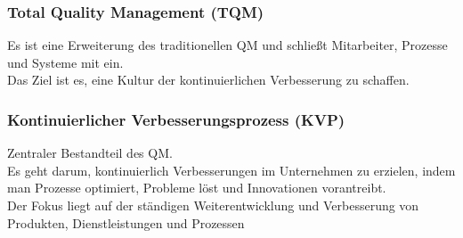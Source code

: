 \documentclass[10pt]{article}
\begin{document}
\subsubsection{Total Quality Management (TQM)}
Es ist eine Erweiterung des traditionellen QM und schließt Mitarbeiter, Prozesse und Systeme mit ein. \\
Das Ziel ist es, eine Kultur der kontinuierlichen Verbesserung zu schaffen. 

\subsubsection{Kontinuierlicher Verbesserungsprozess (KVP)}
Zentraler Bestandteil des QM. \\
Es geht darum, kontinuierlich Verbesserungen im Unternehmen zu erzielen, indem man Prozesse optimiert, Probleme l\"ost und Innovationen vorantreibt. \\
Der Fokus liegt auf der st\"andigen Weiterentwicklung und Verbesserung von Produkten, Dienstleistungen und Prozessen
\end{document}
